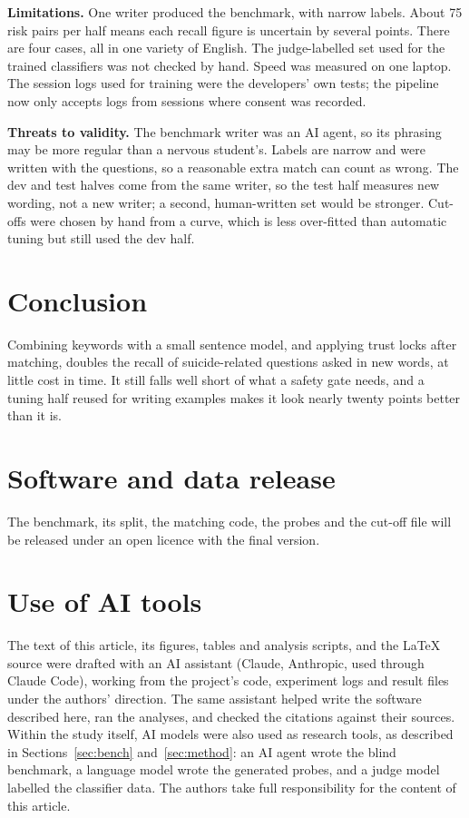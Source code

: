 \documentclass[11pt,a4paper]{article}
\begin{document}
\textbf{Limitations.} One writer produced the benchmark, with narrow labels. About 75 risk pairs per half means each recall figure is uncertain by
several points. There are four cases, all in one variety of English. The judge-labelled set used for the trained classifiers was not checked by
hand. Speed was measured on one laptop. The session logs used for training were the developers' own tests; the pipeline now only accepts logs from
sessions where consent was recorded.

\textbf{Threats to validity.} The benchmark writer was an AI agent, so its phrasing may be more regular than a nervous student's. Labels are
narrow and were written with the questions, so a reasonable extra match can count as wrong. The dev and test halves come from the same writer,
so the test half measures new wording, not a new writer; a second, human-written set would be stronger. Cut-offs were chosen by hand from a
curve, which is less over-fitted than automatic tuning but still used the dev half.

\section{Conclusion}
Combining keywords with a small sentence model, and applying trust locks after matching, doubles the recall of suicide-related questions asked in
new words, at little cost in time. It still falls well short of what a safety gate needs, and a tuning half reused for writing examples makes it
look nearly twenty points better than it is.

\section*{Software and data release}
The benchmark, its split, the matching code, the probes and the cut-off file will be released under an open licence with the final
version.

\section*{Use of AI tools}
The text of this article, its figures, tables and analysis scripts, and the \LaTeX{} source were
drafted with an AI assistant (Claude, Anthropic, used through Claude Code), working from the project's code, experiment logs and result
files under the authors' direction. The same assistant helped write the software described here, ran the analyses, and checked the
citations against their sources. Within the study itself, AI models were also used as research tools, as described in Sections~\ref{sec:bench} and~\ref{sec:method}: an AI agent wrote the blind benchmark, a language model wrote the generated probes, and a judge model labelled the classifier data. The authors take full responsibility for the content of this article.
\end{document}
